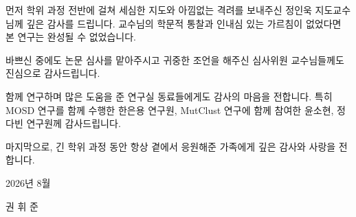 먼저 학위 과정 전반에 걸쳐 세심한 지도와 아낌없는 격려를 보내주신 정인욱 지도교수님께 깊은 감사를 드립니다.
교수님의 학문적 통찰과 인내심 있는 가르침이 없었다면 본 연구는 완성될 수 없었습니다.

바쁘신 중에도 논문 심사를 맡아주시고 귀중한 조언을 해주신 심사위원 교수님들께도 진심으로 감사드립니다.

함께 연구하며 많은 도움을 준 연구실 동료들에게도 감사의 마음을 전합니다.
특히 MOSD 연구를 함께 수행한 한은용 연구원, MutClust 연구에 함께 참여한 윤소현, 정다빈 연구원께 감사드립니다.

마지막으로, 긴 학위 과정 동안 항상 곁에서 응원해준 가족에게 깊은 감사와 사랑을 전합니다.

\vspace{2em}
\hfill 2026년 8월

\hfill 권 휘 준

